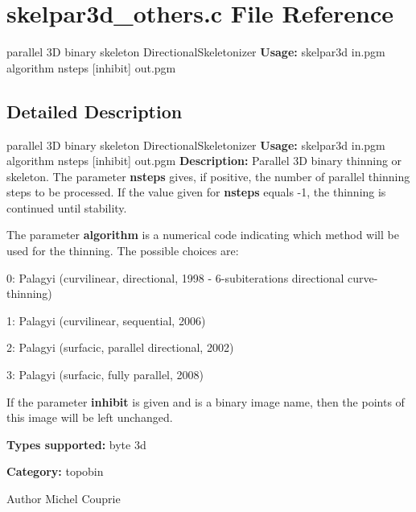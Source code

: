 \section{skelpar3d\_\-others.c File Reference}
\label{skelpar3d__others_8c}


parallel 3D binary skeleton DirectionalSkeletonizer {\bfseries Usage:} skelpar3d in.pgm algorithm nsteps [inhibit] out.pgm  




\subsection{Detailed Description}
parallel 3D binary skeleton DirectionalSkeletonizer {\bfseries Usage:} skelpar3d in.pgm algorithm nsteps [inhibit] out.pgm {\bfseries Description:} Parallel 3D binary thinning or skeleton. The parameter {\bfseries nsteps} gives, if positive, the number of parallel thinning steps to be processed. If the value given for {\bfseries nsteps} equals -\/1, the thinning is continued until stability.

The parameter {\bfseries algorithm} is a numerical code indicating which method will be used for the thinning. The possible choices are: \begin{DoxyItemize}
\item 0: Palagyi (curvilinear, directional, 1998 -\/ 6-\/subiterations directional curve-\/thinning) \item 1: Palagyi (curvilinear, sequential, 2006) \item 2: Palagyi (surfacic, parallel directional, 2002) \item 3: Palagyi (surfacic, fully parallel, 2008)\end{DoxyItemize}
If the parameter {\bfseries inhibit} is given and is a binary image name, then the points of this image will be left unchanged.

{\bfseries Types supported:} byte 3d

{\bfseries Category:} topobin

\begin{DoxyAuthor}{Author}
Michel Couprie 
\end{DoxyAuthor}
